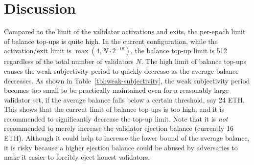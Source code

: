 \section{Discussion}

Compared to the limit of the validator activations and exits, the per-epoch limit of balance top-ups is quite high.  In the current configuration, while the activation/exit limit is $\max(4, N \cdot 2^{-16})$, the balance top-up limit is 512 regardless of the total number of validators $N$.  The high limit of balance top-ups causes the weak subjectivity period to quickly decrease as the average balance decreases.
As shown in Table~\ref{tbl:weak-subjectivity}, the weak subjectivity period becomes too small to be practically maintained even for a reasonably large validator set, if the average balance falls below a certain threshold, say 24 ETH.  This shows that the current limit of balance top-ups is too high, and it is recommended to significantly decrease the top-up limit.
Note that it is \emph{not} recommended to merely increase the validator ejection balance (currently 16 ETH).  Although it could help to increase the lower bound of the average balance, it is risky because a higher ejection balance could be abused by adversaries to make it easier to forcibly eject honest validators.

